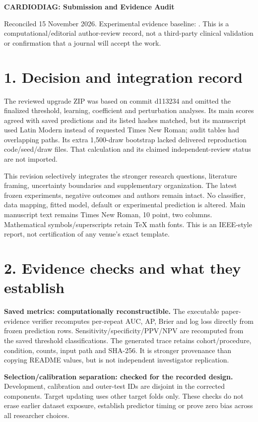 \documentclass[10pt]{article}
\let\originalsection\section
\renewcommand\section{\Needspace{6\baselineskip}\originalsection}
\begin{document}
\normalsize

\begin{center}\textbf{CARDIODIAG: Submission and Evidence Audit}\end{center}
Reconciled 15 November 2026. Experimental evidence baseline: . This is a computational/editorial author-review record, not a third-party clinical validation or confirmation that a journal will accept the work.

\section*{1. Decision and integration record}
The reviewed upgrade ZIP was based on commit d113234 and omitted the finalized threshold, learning, coefficient and perturbation analyses. Its main scores agreed with saved predictions and its listed hashes matched, but its manuscript used Latin Modern instead of requested Times New Roman; audit tables had overlapping paths. Its extra 1,500-draw bootstrap lacked delivered reproduction code/seed/draw files. That calculation and its claimed independent-review status are not imported.

This revision selectively integrates the stronger research questions, literature framing, uncertainty boundaries and supplementary organization. The latest frozen experiments, negative outcomes and authors remain intact. No classifier, data mapping, fitted model, default or experimental prediction is altered. Main manuscript text remains Times New Roman, 10 point, two columns. Mathematical symbols/superscripts retain TeX math fonts. This is an IEEE-style report, not certification of any venue's exact template.

\section*{2. Evidence checks and what they establish}
\textbf{Saved metrics: computationally reconstructible.} The executable paper-evidence verifier recomputes per-repeat AUC, AP, Brier and log loss directly from frozen prediction rows. Sensitivity/specificity/PPV/NPV are recomputed from the saved threshold classifications. The generated trace retains cohort/procedure, condition, counts, input path and SHA-256. It is stronger provenance than copying README values, but is not independent investigator replication.

\textbf{Selection/calibration separation: checked for the recorded design.} Development, calibration and outer-test IDs are disjoint in the corrected components. Target updating uses other target folds only. These checks do not erase earlier dataset exposure, establish predictor timing or prove zero bias across all researcher choices.
\end{document}
